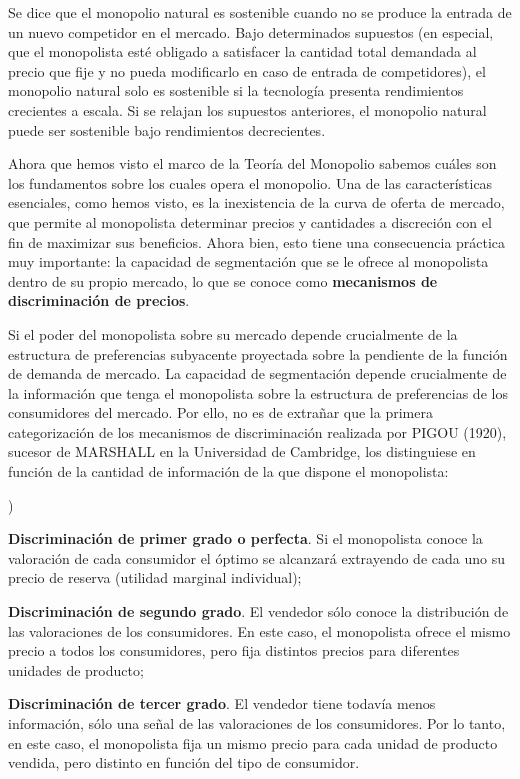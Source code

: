 \documentclass[10pt,a4paper]{article}
\newcounter{alphaitem}
\newenvironment{la}
      {\begin{list}{\alph{alphaitem})}{%
          \usecounter{alphaitem}%
          \setlength{\leftmargin}{1cm}%
          \setlength{\parskip}{3pt}%
          \setlength{\itemsep}{0pt}%
          \setlength{\parsep}{0pt}%
      }}
      {\end{list}}
\begin{document}
{	Se dice que el monopolio natural es sostenible cuando no se produce la entrada de un nuevo competidor en el mercado. Bajo determinados supuestos (en especial, que el monopolista esté obligado a satisfacer la cantidad total demandada al precio que fije y no pueda modificarlo en caso de entrada de competidores), el monopolio natural solo es sostenible si la tecnología presenta rendimientos crecientes a escala. Si se relajan los supuestos anteriores, el monopolio natural puede ser sostenible bajo rendimientos decrecientes.
}
	
Ahora que hemos visto el marco de la Teoría del Monopolio sabemos cuáles son los fundamentos sobre los cuales opera el monopolio. Una de las características esenciales, como hemos visto, es la inexistencia de la curva de oferta de mercado, que permite al monopolista determinar precios y cantidades a discreción con el fin de maximizar sus beneficios. Ahora bien, esto tiene una consecuencia práctica muy importante: la capacidad de segmentación que se le ofrece al monopolista dentro de su propio mercado, lo que se conoce como \textbf{mecanismos de discriminación de precios}.

Si el poder del monopolista sobre su mercado depende crucialmente de la estructura de preferencias subyacente proyectada sobre la pendiente de la función de demanda de mercado. La capacidad de segmentación depende crucialmente de la información que tenga el monopolista sobre la estructura de preferencias de los consumidores del mercado. Por ello, no es de extrañar que la primera categorización de los mecanismos de discriminación realizada por PIGOU (1920), sucesor de MARSHALL en la Universidad de Cambridge, los distinguiese en función de la cantidad de información de la que dispone el monopolista:
\begin{la}
    \item \textbf{Discriminación de primer grado o perfecta}. Si el monopolista conoce la valoración de cada consumidor el óptimo se alcanzará extrayendo de cada uno su precio de reserva (utilidad marginal individual);
    \item \textbf{Discriminación de segundo grado}. El vendedor sólo conoce la distribución de las valoraciones de los consumidores. En este caso, el monopolista ofrece el mismo precio a todos los consumidores, pero fija distintos precios para diferentes unidades de producto;
    \item \textbf{Discriminación de tercer grado}. El vendedor tiene todavía menos información, sólo una señal de las valoraciones de los consumidores. Por lo tanto, en este caso, el monopolista fija un mismo precio para cada unidad de producto vendida, pero distinto en función del tipo de consumidor.
\end{la}
	
\end{document}
